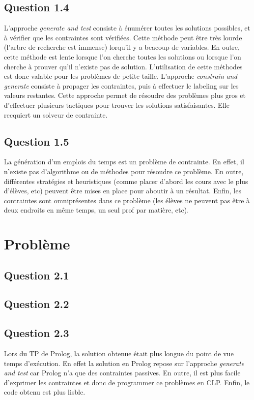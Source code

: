 \documentclass[a4paper]{article}
\begin{document}
\subsection{Question 1.4}
L'approche \textit{generate and test} consiste à énumérer toutes les solutions possibles, et à vérifier que les contraintes sont vérifiées. Cette méthode peut être très lourde (l'arbre de recherche est immense) lorqu'il y a beacoup de variables. En outre, cette méthode est lente lorsque l'on cherche toutes les solutions ou lorsque l'on cherche à prouver qu'il n'existe pas de solution. L'utilisation de cette méthodes est donc valable pour les problèmes de petite taille.
L'approche \textit{constrain and generate} consiste à propager les contraintes, puis à effectuer le labeling sur les valeurs restantes. Cette approche permet de résoudre des problèmes plus gros et d'effectuer plusieurs tactiques pour trouver les solutions satisfaisantes. Elle recquiert un solveur de contrainte.

\subsection{Question 1.5}
La génération d'un emplois du temps est un problème de contrainte. En effet, il n'existe pas d'algorithme ou de méthodes pour résoudre ce problème. En outre, différentes stratégies et heuristiques (comme placer d'abord les cours avec le plus d'élèves, etc) peuvent être mises en place pour aboutir à un résultat. Enfin, les contraintes sont omniprésentes dans ce problème (les élèves ne peuvent pas être à deux endroits en même temps, un seul prof par matière, etc).

\section{Problème}

\subsection{Question 2.1}


\subsection{Question 2.2}

\subsection{Question 2.3}
Lors du TP de Prolog, la solution obtenue était plus longue du point de vue temps d'exécution. En effet la solution en Prolog repose sur l'approche \textit{generate and test} car Prolog n'a que des contraintes passives. En outre, il est plus facile d'exprimer les contraintes et donc de programmer ce problèmes en CLP. Enfin, le code obtenu est plus lisble.
\end{document}
